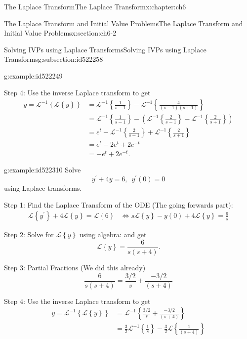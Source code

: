 \documentclass[oneside,10pt,]{book}
\numberwithin{equation}{section}
\numberwithin{equation}{section}
\newcommand{\amp}{&}
\begin{document}
\begin{chapterptx}{The Laplace Transform}{}{The Laplace Transform}{}{}{x:chapter:ch6}
\begin{sectionptx}{The Laplace Transform and Initial Value Problems}{}{The Laplace Transform and Initial Value Problems}{}{}{x:section:ch6-2}
\begin{subsectionptx}{Solving IVPs using Laplace Transforms}{}{Solving IVPs using Laplace Transforms}{}{}{g:subsection:id522258}
\begin{example}{}{g:example:id522249}
%
\par
Step 4: Use the inverse Laplace transform to get%
\begin{align*}
y=\mathcal{L}^{-1}\left\{ \mathcal{L}\left\{ y\right\} \right\}  \amp =\mathcal{L}^{-1}\left\{ \frac{1}{s-1}\right\} -\mathcal{L}^{-1}\left\{ \frac{4}{\left(s-1\right)\left(s+1\right)}\right\} \\
\amp =\mathcal{L}^{-1}\left\{ \frac{1}{s-1}\right\} -\left(\mathcal{L}^{-1}\left\{ \frac{2}{s-1}\right\} -\mathcal{L}^{-1}\left\{ \frac{2}{s+1}\right\} \right)\\
\amp =e^{t}-\mathcal{L}^{-1}\left\{ \frac{2}{s-1}\right\} +\mathcal{L}^{-1}\left\{ \frac{2}{s+1}\right\} \\
\amp =e^{t}-2e^{t}+2e^{-t}\\
\amp =-e^{t}+2e^{-t}.
\end{align*}
%
\end{example}
\begin{example}{}{g:example:id522310}%
Solve%
\begin{equation*}
y^{\prime}+4y=6,\,\,\,y^{\prime}(0)=0
\end{equation*}
using Laplace transforms.%
\par
Step 1: Find the Laplace Transform of the ODE (The going forwards part):%
\begin{align*}
\mathcal{L}\left\{ y^{\prime}\right\} +4\mathcal{L}\left\{ y\right\} =\mathcal{L}\left\{ 6\right\}  \amp \iff s\mathcal{L}\left\{ y\right\} -y(0)+4\mathcal{L}\left\{ y\right\} =\frac{6}{s}
\end{align*}
%
\par
Step 2: Solve for \(\mathcal{L}\left\{ y\right\} \) using algebra: and get%
\begin{equation*}
\mathcal{L}\left\{ y\right\} =\frac{6}{s\left(s+4\right)}.
\end{equation*}
%
\par
Step 3: Partial Fractions (We did this already)%
\begin{equation*}
\frac{6}{s\left(s+4\right)}=\frac{3/2}{s}+\frac{-3/2}{\left(s+4\right)}
\end{equation*}
%
\par
Step 4: Use the inverse Laplace transform to get%
\begin{align*}
y=\mathcal{L}^{-1}\left\{ \mathcal{L}\left\{ y\right\} \right\}  \amp =\mathcal{L}^{-1}\left\{ \frac{3/2}{s}+\frac{-3/2}{\left(s+4\right)}\right\} \\
\amp =\frac{3}{2}\mathcal{L}^{-1}\left\{ \frac{1}{s}\right\} -\frac{3}{2}\mathcal{L}\left\{ \frac{1}{\left(s+4\right)}\right\} \\

\end{align*}
\end{example}
\end{subsectionptx}
\end{sectionptx}
\end{chapterptx}
\end{document}
